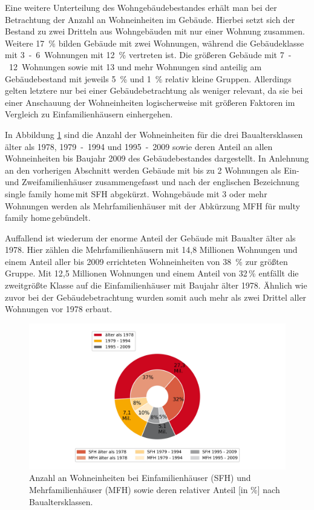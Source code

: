 Eine weitere Unterteilung des Wohngebäudebestandes erhält man bei der Betrachtung der Anzahl an Wohneinheiten im Gebäude. 
Hierbei setzt sich der Bestand zu zwei Dritteln aus Wohngebäuden mit nur einer Wohnung zusammen. 
Weitere \mbox{17 \%} bilden Gebäude mit zwei Wohnungen, während die Gebäudeklasse mit \mbox{3 - 6 Wohnungen} mit \mbox{12 \%} vertreten ist. 
Die größeren Gebäude mit \mbox{7 - 12 Wohnungen} sowie mit 13 und mehr Wohnungen sind anteilig am Gebäudebestand mit jeweils \mbox{5 \%} und \mbox{1 \%} relativ kleine Gruppen. 
Allerdings gelten letztere nur bei einer Gebäudebetrachtung als weniger relevant, da sie bei einer Anschauung der Wohneinheiten logischerweise mit größeren Faktoren im Vergleich zu Einfamilienhäusern einhergehen. \cite{StatistischeAmterdesBundesundderLander.2014b}

In Abbildung \ref{fig: Abbildung212} sind die Anzahl der Wohneinheiten für die drei Baualtersklassen älter als 1978, \mbox{1979 - 1994} und \mbox{1995 - 2009} sowie deren Anteil an allen Wohneinheiten bis Baujahr 2009 des Gebäudebestandes dargestellt. 
In Anlehnung an den vorherigen Abschnitt werden Gebäude mit bis zu 2 Wohnungen als Ein- und Zweifamilienhäuser zusammengefasst und nach der englischen Bezeichnung \glqq single family home\grqq\,mit SFH abgekürzt. 
Wohngebäude mit 3 oder mehr Wohnungen werden als Mehrfamilienhäuser mit der Abkürzung MFH für \glqq multy family home\grqq\,gebündelt. 

Auffallend ist wiederum der enorme Anteil der Gebäude mit Baualter älter als 1978. 
Hier zählen die Mehrfamilienhäusern mit 14,8 Millionen Wohnungen und einem Anteil aller bis 2009 errichteten Wohneinheiten von \mbox{38 \%} zur größten Gruppe. 
Mit 12,5 Millionen Wohnungen und einem Anteil von 32\,\% entfällt die zweitgrößte Klasse auf die Einfamilienhäuser mit Baujahr älter 1978.
Ähnlich wie zuvor bei der Gebäudebetrachtung wurden somit auch mehr als zwei Drittel aller Wohnungen vor 1978 erbaut.

\begin{figure}[H]
	\centering
		\includegraphics{Pictures/GebaeudeGroesse.jpg}
	\caption{Anzahl an Wohneinheiten bei Einfamilienhäuser (SFH) und Mehrfamilienhäuser (MFH) sowie deren relativer Anteil [in \%] nach Baualtersklassen. \cite{StatistischeAmterdesBundesundderLander.2014b}}
	\label{fig: Abbildung212} 
\end{figure}

